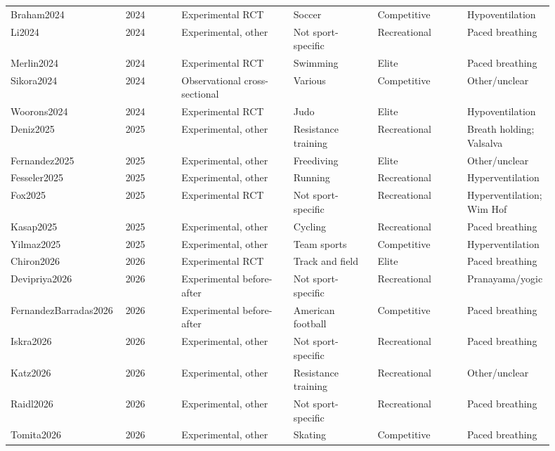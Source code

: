 \begin{landscape}
\begin{longtable}{@{}p{0.17\linewidth}p{0.10\linewidth}p{0.20\linewidth}p{0.15\linewidth}p{0.16\linewidth}p{0.12\linewidth}@{}}
Braham2024 & 2024 & Experimental RCT & Soccer & Competitive & Hypoventilation \\
Li2024 & 2024 & Experimental, other & Not sport-specific & Recreational & Paced breathing \\
Merlin2024 & 2024 & Experimental RCT & Swimming & Elite & Paced breathing \\
Sikora2024 & 2024 & Observational cross-sectional & Various & Competitive & Other/unclear \\
Woorons2024 & 2024 & Experimental RCT & Judo & Elite & Hypoventilation \\
Deniz2025 & 2025 & Experimental, other & Resistance training & Recreational & Breath holding; Valsalva \\
Fernandez2025 & 2025 & Experimental, other & Freediving & Elite & Other/unclear \\
Fesseler2025 & 2025 & Experimental, other & Running & Recreational & Hyperventilation \\
Fox2025 & 2025 & Experimental RCT & Not sport-specific & Recreational & Hyperventilation; Wim Hof \\
Kasap2025 & 2025 & Experimental, other & Cycling & Recreational & Paced breathing \\
Yilmaz2025 & 2025 & Experimental, other & Team sports & Competitive & Hyperventilation \\
Chiron2026 & 2026 & Experimental RCT & Track and field & Elite & Paced breathing \\
Devipriya2026 & 2026 & Experimental before-after & Not sport-specific & Recreational & Pranayama/yogic \\
FernandezBarradas2026 & 2026 & Experimental before-after & American football & Competitive & Paced breathing \\
Iskra2026 & 2026 & Experimental, other & Not sport-specific & Recreational & Paced breathing \\
Katz2026 & 2026 & Experimental, other & Resistance training & Recreational & Other/unclear \\
Raidl2026 & 2026 & Experimental, other & Not sport-specific & Recreational & Paced breathing \\
Tomita2026 & 2026 & Experimental, other & Skating & Competitive & Paced breathing \\
\end{longtable}
\end{landscape}
